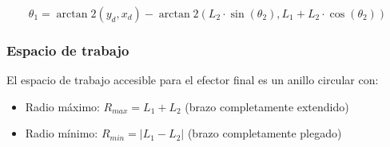 \begin{equation}
    \theta_1 = \arctan2(y_d, x_d) - \arctan2(L_2 \cdot \sin(\theta_2), L_1 + L_2 \cdot \cos(\theta_2))
\end{equation}

\subsubsection{Espacio de trabajo}

El espacio de trabajo accesible para el efector final es un anillo circular con:

\begin{itemize}[label=$\bullet$]
    \item Radio máximo: $R_{max} = L_1 + L_2$ (brazo completamente extendido)
    \item Radio mínimo: $R_{min} = |L_1 - L_2|$ (brazo completamente plegado)
\end{itemize}






